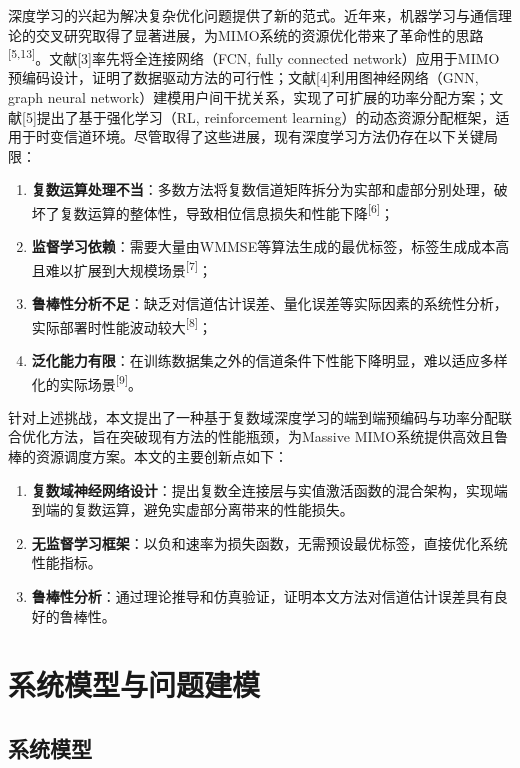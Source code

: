 \documentclass[twoside, 10pt]{ctexart}
\newcommand{\upcite}[1]{\textsuperscript{[#1]}}\newcommand{\normalcite}[1]{[#1]}
\begin{document}
深度学习的兴起为解决复杂优化问题提供了新的范式。近年来，机器学习与通信理论的交叉研究取得了显著进展，为MIMO系统的资源优化带来了革命性的思路\upcite{5,13}。文献\normalcite{3}率先将全连接网络（FCN, fully connected network）应用于MIMO预编码设计，证明了数据驱动方法的可行性；文献\normalcite{4}利用图神经网络（GNN, graph neural network）建模用户间干扰关系，实现了可扩展的功率分配方案；文献\normalcite{5}提出了基于强化学习（RL, reinforcement learning）的动态资源分配框架，适用于时变信道环境。尽管取得了这些进展，现有深度学习方法仍存在以下关键局限：

\begin{enumerate}[label=\arabic*), topsep=0pt, partopsep=0pt, itemsep=-5pt]
    \item \textbf{复数运算处理不当}：多数方法将复数信道矩阵拆分为实部和虚部分别处理，破坏了复数运算的整体性，导致相位信息损失和性能下降\upcite{6}；
    \item \textbf{监督学习依赖}：需要大量由WMMSE等算法生成的最优标签，标签生成成本高且难以扩展到大规模场景\upcite{7}；
    \item \textbf{鲁棒性分析不足}：缺乏对信道估计误差、量化误差等实际因素的系统性分析，实际部署时性能波动较大\upcite{8}；
    \item \textbf{泛化能力有限}：在训练数据集之外的信道条件下性能下降明显，难以适应多样化的实际场景\upcite{9}。
\end{enumerate}

针对上述挑战，本文提出了一种基于复数域深度学习的端到端预编码与功率分配联合优化方法，旨在突破现有方法的性能瓶颈，为Massive MIMO系统提供高效且鲁棒的资源调度方案。本文的主要创新点如下：
\begin{enumerate}[label=\arabic*), topsep=0pt, partopsep=0pt, itemsep=-5pt]
    \item \textbf{复数域神经网络设计}：提出复数全连接层与实值激活函数的混合架构，实现端到端的复数运算，避免实虚部分离带来的性能损失。
    \item \textbf{无监督学习框架}：以负和速率为损失函数，无需预设最优标签，直接优化系统性能指标。
    \item \textbf{鲁棒性分析}：通过理论推导和仿真验证，证明本文方法对信道估计误差具有良好的鲁棒性。
\end{enumerate}


\section{系统模型与问题建模}

\subsection{系统模型}
\end{document}
